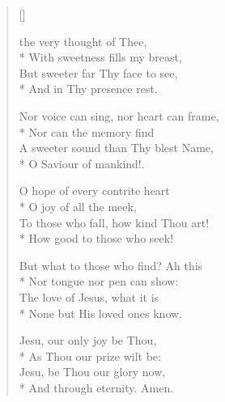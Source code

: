 \newHymn
{}

\begin{verse}[\versewidth]


 the very thought of Thee,\\*
With sweetness fills my breast,\\
But sweeter far Thy face to see,\\*
And in Thy presence rest.
\pointorig

Nor voice can sing, nor heart can frame,\\*
Nor can the memory find\\
A sweeter sound than Thy blest Name,\\*
O Saviour of mankind!.

O hope of every contrite heart\\*
O joy of all the meek,\\
To those who fall, how kind Thou art!\\*
How good to those who seek! 

But what to those who find? Ah this\\*
Nor tongue nor pen can show:\\
The love of Jesus, what it is\\*
None but His loved ones know.

Jesu, our only joy be Thou,\\*
As Thou our prize wilt be:\\
Jesu, be Thou our glory now,\\*
And through eternity.
Amen. 

\end{verse}



